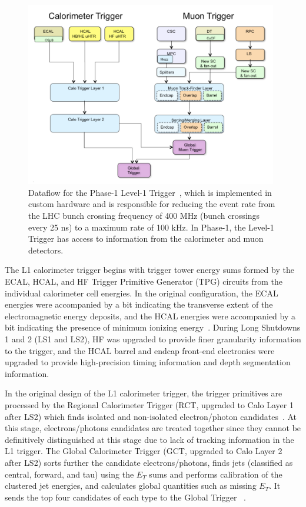 \begin{figure}[ht]
    \centering
    \includegraphics[width=11cm]{figures/ch-2-cern-cms/phase-1-level-1-trigger-dataflow.png}
    \caption[Dataflow for the Phase-1 Level-1 Trigger.]{Dataflow for the Phase-1 Level-1 Trigger~\cite{CMS-TDR-012}, which is implemented in custom hardware and is responsible for reducing the event rate from the LHC bunch crossing frequency of 400 MHz (bunch crossings every 25 ns) to a maximum rate of 100 kHz. In Phase-1, the Level-1 Trigger has access to information from the calorimeter and muon detectors.}
    \label{fig:phase-1-level-1-trigger-dataflow}
\end{figure}

The L1 calorimeter trigger begins with trigger tower energy sums formed by the ECAL, HCAL, and HF Trigger Primitive Generator (TPG) circuits from the individual calorimeter cell energies. In the original configuration, the ECAL energies were accompanied by a bit indicating the transverse extent of the electromagnetic energy deposits, and the HCAL energies were accompanied by a bit indicating the presence of minimum ionizing energy~\cite{CERN-LHCC-2000-038}. During Long Shutdowns 1 and 2 (LS1 and LS2), HF was upgraded to provide finer granularity information to the trigger, and the HCAL barrel and endcap front-end electronics were upgraded to provide high-precision timing information and depth segmentation information. 

In the original design of the L1 calorimeter trigger, the trigger primitives are processed by the Regional Calorimeter Trigger (RCT, upgraded to Calo Layer 1 after LS2) which finds isolated and non-isolated electron/photon candidates~\cite{CMS-TDR-012}. At this stage, electrons/photons candidates are treated together since they cannot be definitively distinguished at this stage due to lack of tracking information in the L1 trigger. The Global Calorimeter Trigger (GCT, upgraded to Calo Layer 2 after LS2) sorts further the candidate electrons/photons, finds jets (classified as central, forward, and tau) using the $E_T$ sums and performs calibration of the clustered jet energies, and calculates global quantities such as missing $E_T$. It sends the top four candidates of each type to the Global Trigger ~\cite{CMS-TDR-012}. 

